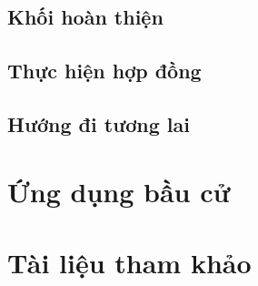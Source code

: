 \documentclass[12pt]{article}
\begin{document}
		\subsection{Khối hoàn thiện}
		
		
		\subsection{Thực hiện hợp đồng}
		
		
		\subsection{Hướng đi tương lai}
			
	
	\newpage
	\section{Ứng dụng bầu cử}
	
	
	\newpage
	\section{Tài liệu tham khảo}
	
\end{document}
